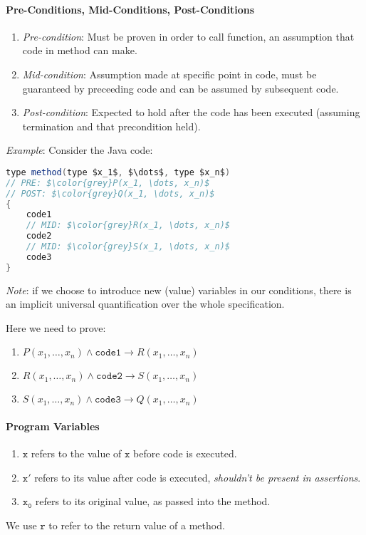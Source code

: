 \documentclass[10pt,twoside,twocolumn]{article}
\begin{document}
\paragraph{Pre-Conditions, Mid-Conditions, Post-Conditions}
\begin{enumerate}
\item \emph{Pre-condition}: Must be proven in order to call function, an
assumption that code in method can make.
\item \emph{Mid-condition}: Assumption made at specific point in code, must
be guaranteed by preceeding code and can be assumed by subsequent
code.
\item \emph{Post-condition}: Expected to hold after the code has been executed
(assuming termination and that precondition held).
\end{enumerate}
\emph{Example}: Consider the Java code:
\begin{lstlisting}[language=Java,basicstyle={\small\ttfamily},tabsize=4,mathescape=true,commentstyle={\color{grey}}]
type method(type $x_1$, $\dots$, type $x_n$)
// PRE: $\color{grey}P(x_1, \dots, x_n)$
// POST: $\color{grey}Q(x_1, \dots, x_n)$
{
	code1
	// MID: $\color{grey}R(x_1, \dots, x_n)$
	code2
	// MID: $\color{grey}S(x_1, \dots, x_n)$
	code3
}
\end{lstlisting}
\emph{Note}: if we choose to introduce new (value) variables in our
conditions, there is an implicit universal quantification over the
whole specification.

Here we need to prove:
\begin{enumerate}
\item $P\left(x_{1},\dots,x_{n}\right)\land\mathtt{code1}\rightarrow R\left(x_{1},\dots,x_{n}\right)$
\item $R\left(x_{1},\dots,x_{n}\right)\land\mathtt{code2}\rightarrow S\left(x_{1},\dots,x_{n}\right)$
\item $S\left(x_{1},\dots,x_{n}\right)\land\mathtt{code3}\rightarrow Q\left(x_{1},\dots,x_{n}\right)$
\end{enumerate}

\paragraph{Program Variables}
\begin{enumerate}
\item $\mathtt{x}$ refers to the value of $\mathtt{x}$ before code is
executed.
\item $\mathtt{x'}$ refers to its value after code is executed, \emph{shouldn't
be present in assertions}.
\item $\mathtt{x_{0}}$ refers to its original value, as passed into the
method.
\end{enumerate}
We use $\mathtt{r}$ to refer to the return value of a method.
\end{document}
